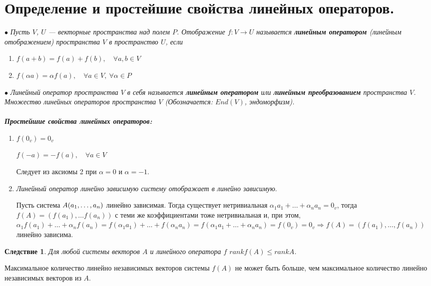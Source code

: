 \section{Определение и простейшие свойства линейных операторов.}
$\bullet$ \textit{Пусть $V$, $U$ --- векторные пространства над полем $P$. Отображение $f : V \rightarrow U$ называется \textbf{линейным оператором} (линейным отображением) пространства $V$ в пространство $U$, если}
\begin{enumerate}
	\item $f(a+b) = f(a) + f(b),\quad \forall a,b \in V$
	\item $f(\alpha a) = \alpha f(a), \quad \forall a\in V,\  \forall \alpha \in P$
\end{enumerate}
$\bullet$ \textit{Линейный оператор пространства $V$ в себя называется \textbf{линейным оператором} или \textbf{линейным преобразованием} пространства $V$. Множество линейных операторов пространства $V$ (Обозначается: $End(V)$, эндоморфизм).}\\\\
\textit{\textbf{Простейшие свойства линейных операторов:}}
\begin{enumerate}
	\item $f(0_v) = 0_v$
	
	$f(-a) = -f(a), \quad \forall a\in V$
	
	\begin{Proof}
		Следует из аксиомы 2 при $\alpha = 0$ и $\alpha = -1$.
	\end{Proof}
	
	\item \textit{Линейный оператор линейно зависимую систему отображает в линейно зависимую}.
	\begin{Proof}
		Пусть система $A(a_1,\dots,a_n)$ линейно зависимая. Тогда существует нетривиальная $\alpha_1 a_1 + \ldots + \alpha_n a_n = 0_v$, тогда $f(A) = (f(a_1),\dots f(a_n))$ с теми же коэффициентами тоже нетривиальная и, при этом, $\alpha_1 f(a_1) + \ldots + \alpha_n f(a_n) =f(\alpha_1 a_1) + \ldots + f(\alpha_n a_n) =f(\alpha_1 a_1 + \ldots + \alpha_n a_n) = f(0_v) = 0_v \Rightarrow f(A) = (f(a_1),\dots,f(a_n))$ линейно зависима.
	\end{Proof}
\end{enumerate}
\newtheorem*{cor2_1}{Следствие}\begin{cor2_1} Для любой системы векторов $A$ и линейного оператора $f$ $rank f(A) \leqslant rank A$.\end{cor2_1}\begin{Proof}
	Максимальное количество линейно независимых векторов системы $f(A)$ не может быть больше, чем максимальное количество линейно независимых векторов из $A$.
\end{Proof}
